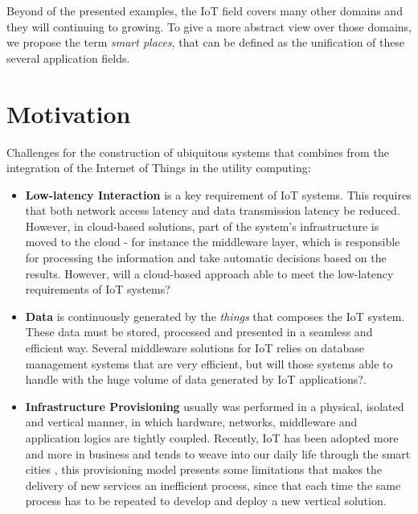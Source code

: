 Beyond of the presented examples, the \gls{IoT} field covers many other domains and they will
continuing to growing. To give a more abstract view over those domains, we propose the term
\textit{smart places}, that can be defined as the unification of these several application fields.

\section{Motivation}
\label{section:motivation}
Challenges \cite{caceres2012ubicomp} for the construction of ubiquitous systems that combines from
the integration of the Internet of Things in the utility computing:

\begin{itemize}
  \item \textbf{Low-latency Interaction} is a key requirement of \gls{IoT} systems. This requires that
  both network access latency and data transmission latency be reduced. However, in cloud-based solutions,
  part of the system's infrastructure is moved to the cloud - for instance the middleware layer,
  which is responsible for processing the information and take automatic decisions based on the results.
  However, will a cloud-based approach able to meet the low-latency requirements of \gls{IoT} systems?
  \item \textbf{Data} is continuously generated by the \textit{things} that composes the \gls{IoT}
  system. These data must be stored, processed and presented in a seamless and efficient way.
  Several middleware solutions for \gls{IoT} \cite{floerkemeier2007rfid}\cite{eisenhauer2010hydra}\cite{de2008socrades}
  relies on database management systems that are very efficient, but will those systems able to
  handle with the huge volume of data generated by \gls{IoT} applications?.
  \item \textbf{Infrastructure Provisioning} usually was performed in a physical, isolated and vertical
  manner, in which hardware, networks, middleware and application logics are tightly coupled. Recently,
  \gls{IoT} has been adopted more and more in business and tends to weave into our daily life through the smart cities
  \cite{caragliu2011smart}\cite{schaffers2011smart}, this provisioning model presents some limitations
  that makes the delivery of new services an inefficient process, since that each time the same process
  has to be repeated to develop and deploy a new vertical solution.

\end{itemize}
